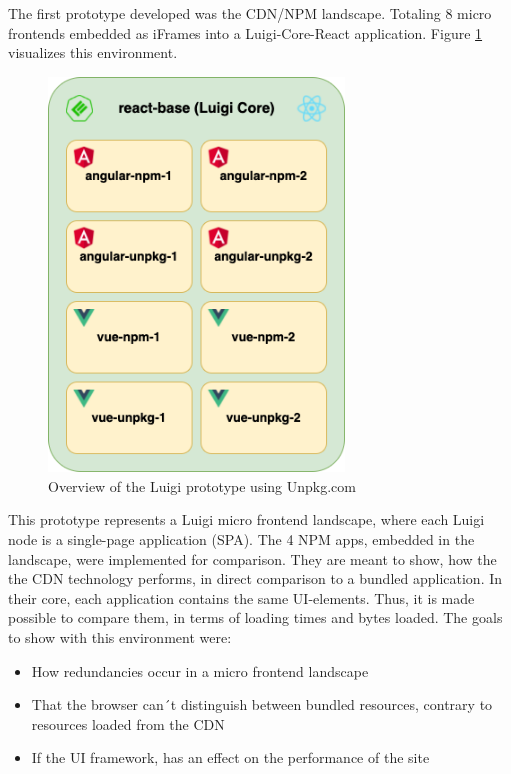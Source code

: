 The first prototype developed was the CDN/NPM landscape. Totaling 8 micro frontends embedded as iFrames into a Luigi-Core-React application.
Figure \ref{fig:unpkg_prototype_architecture} visualizes this environment.
 
\begin{figure}[!h]
	\centering
	\includegraphics[width=0.7\textwidth]{Figures/unpkg.architecture.drawio.png}
	\caption{Overview of the Luigi prototype using Unpkg.com}
	\label{fig:unpkg_prototype_architecture}
\end{figure}

This prototype represents a Luigi micro frontend landscape, where each Luigi node is a single-page application (SPA). 
The 4 NPM apps, embedded in the landscape, were implemented for comparison. They are meant to show, how the the CDN technology performs, in direct comparison to a bundled application.
In their core, each application contains the same UI-elements. Thus, it is made possible to compare them, in terms of loading times and bytes loaded.
The goals to show with this environment were:

\begin{itemize}
	\item How redundancies occur in a micro frontend landscape
	\item That the browser can´t distinguish between bundled resources, contrary to resources loaded from the CDN
	\item If the UI framework, has an effect on the performance of the site
\end{itemize}

